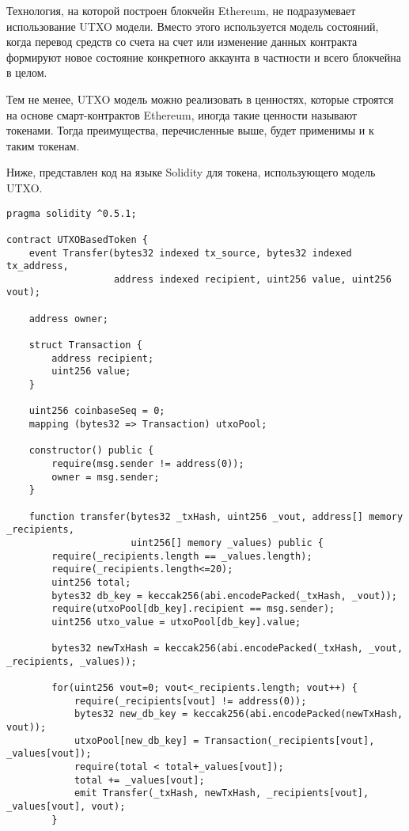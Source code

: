 Технология, на которой построен блокчейн Ethereum, не подразумевает использование UTXO модели. Вместо этого используется модель состояний, когда перевод средств со счета на счет или изменение данных контракта формируют новое состояние конкретного аккаунта в частности и всего блокчейна в целом.

Тем не менее, UTXO модель можно реализовать в ценностях, которые строятся на основе смарт-контрактов Ethereum, иногда такие ценности называют токенами. Тогда преимущества, перечисленные выше, будет применимы и к таким токенам.

Ниже, представлен код на языке Solidity для токена, использующего модель UTXO.

\begin{verbatim}
pragma solidity ^0.5.1;

contract UTXOBasedToken {
    event Transfer(bytes32 indexed tx_source, bytes32 indexed tx_address, 
                   address indexed recipient, uint256 value, uint256 vout);

    address owner;

    struct Transaction {
        address recipient;
        uint256 value;
    }

    uint256 coinbaseSeq = 0;
    mapping (bytes32 => Transaction) utxoPool;
    
    constructor() public {
        require(msg.sender != address(0));
        owner = msg.sender;
    }

    function transfer(bytes32 _txHash, uint256 _vout, address[] memory _recipients, 
                      uint256[] memory _values) public {
        require(_recipients.length == _values.length);
        require(_recipients.length<=20);
        uint256 total;
        bytes32 db_key = keccak256(abi.encodePacked(_txHash, _vout));
        require(utxoPool[db_key].recipient == msg.sender);
        uint256 utxo_value = utxoPool[db_key].value;

        bytes32 newTxHash = keccak256(abi.encodePacked(_txHash, _vout, _recipients, _values));

        for(uint256 vout=0; vout<_recipients.length; vout++) {
            require(_recipients[vout] != address(0));
            bytes32 new_db_key = keccak256(abi.encodePacked(newTxHash, vout));
            utxoPool[new_db_key] = Transaction(_recipients[vout], _values[vout]);
            require(total < total+_values[vout]);
            total += _values[vout];
            emit Transfer(_txHash, newTxHash, _recipients[vout], _values[vout], vout);
        }


\end{verbatim}

